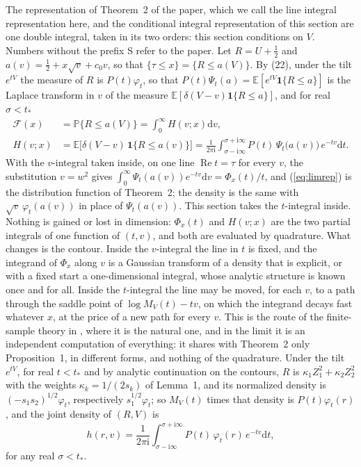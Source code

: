 \documentclass[ecta,nameyear,final,supplement]{econsocart}
\newcommand{\E}{{\mathbb E}}
\newcommand{\PP}{{\mathbb P}}
\newcommand{\dr}[1]{{\mathrm d}#1}
\newcommand{\iu}{{\mathrm i}}
\newcommand{\Rea}{\operatorname{Re}}
\newcommand{\cF}{\mathcal{F}}
\theoremstyle{plain}
\theoremstyle{definition}
\begin{document}
The representation of Theorem~2 of the paper, which we call the line integral representation here, and the conditional integral representation of this section are one double integral, taken in its two orders: this section conditions on $V$.  Numbers without the prefix S refer to the paper.  Let $R=U+\frac12$ and $a(v)=\frac12+x\sqrt v+c_0v$, so that $\{\tau\le x\}=\{R\le a(V)\}$.  By (22), under the tilt $e^{tV}$ the measure of $R$ is $P(t)\varphi_t$, so that $P(t)\Psi_t(a)=\E[e^{tV}\mathbf{1}\{R\le a\}]$ is the Laplace transform in $v$ of the measure $\E[\delta(V-v)\mathbf{1}\{R\le a\}]$, and for real $\sigma<t_*$
\begin{equation}
\begin{aligned}
\cF(x)&=\PP\{R\le a(V)\}=\int_0^\infty H(v;x)\dr{v},\\
H(v;x)&=\E\big[\delta(V-v)\,\mathbf{1}\{R\le a(v)\}\big]=\frac1{2\pi\iu}\int_{\sigma-\iu\infty}^{\sigma+\iu\infty}P(t)\,\Psi_t\big(a(v)\big)\,e^{-tv}\dr{t}.
\end{aligned}
\label{eq:limrep}
\end{equation}
With the $v$-integral taken inside, on one line $\Rea t=\tau$ for every $v$, the substitution $v=w^2$ gives $\int_0^\infty\Psi_t(a(v))e^{-tv}\dr{v}=\Phi_x(t)/t$, and (\ref{eq:limrep}) is the distribution function of Theorem~2; the density is the same with $\sqrt v\,\varphi_t(a(v))$ in place of $\Psi_t(a(v))$.  This section takes the $t$-integral inside.  Nothing is gained or lost in dimension: $\Phi_x(t)$ and $H(v;x)$ are the two partial integrals of one function of $(t,v)$, and both are evaluated by quadrature.  What changes is the contour.  Inside the $v$-integral the line in $t$ is fixed, and the integrand of $\Phi_x$ along $v$ is a Gaussian transform of a density that is explicit, or with a fixed start a one-dimensional integral, whose analytic structure is known once and for all.  Inside the $t$-integral the line may be moved, for each $v$, to a path through the saddle point of $\log M_V(t)-tv$, on which the integrand decays fast whatever $x$, at the price of a new path for every $v$.  This is the route of the finite-sample theory in \cite{BaoBrodaKan2026}, where it is the natural one, and in the limit it is an independent computation of everything: it shares with Theorem~2 only Proposition~1, in different forms, and nothing of the quadrature.
Under the tilt $e^{tV}$, for real $t<t_*$ and by analytic continuation on the contours, $R$ is $\kappa_1Z_1^2+\kappa_2Z_2^2$ with the weights $\kappa_k=1/(2s_k)$ of Lemma~1, and its normalized density is $(-s_1s_2)^{1/2}\varphi_t$, respectively $s_1^{1/2}\varphi_t$; so $M_V(t)$ times that density is $P(t)\varphi_t(r)$, and the joint density of $(R,V)$ is
\begin{equation}
h(r,v)=\frac1{2\pi\iu}\int_{\sigma-\iu\infty}^{\sigma+\iu\infty}P(t)\,\varphi_t(r)\,e^{-tv}\dr{t},
\label{eq:hrv}
\end{equation}
for any real $\sigma<t_*$.
\end{document}
